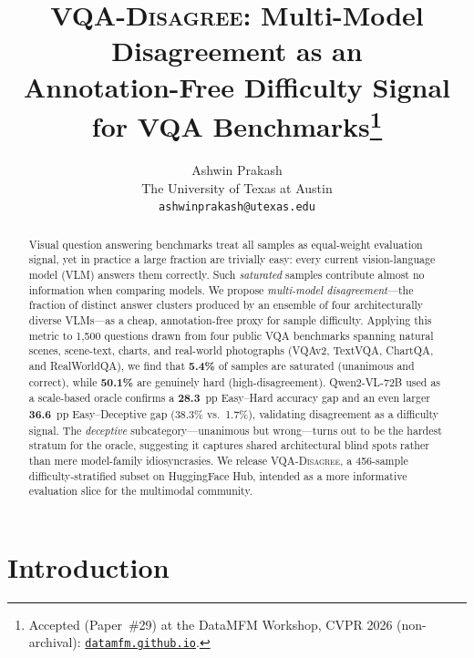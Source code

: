 \documentclass[10pt,twocolumn,letterpaper]{article}
\newcommand{\dname}{\textsc{VQA-Disagree}}
\begin{document}
\title{\dname{}: Multi-Model Disagreement as an\\Annotation-Free Difficulty Signal for VQA Benchmarks\thanks{Accepted (Paper~\#29) at the DataMFM Workshop, CVPR 2026 (non-archival): \href{https://datamfm.github.io/}{\nolinkurl{datamfm.github.io}}.}}

\author{Ashwin Prakash\\
The University of Texas at Austin\\
{\tt\small ashwinprakash@utexas.edu}
}

\maketitle

\begin{abstract}
Visual question answering benchmarks treat all samples as equal-weight evaluation
signal, yet in practice a large fraction are trivially easy: every
current vision-language model (VLM) answers them correctly.  Such
\emph{saturated} samples contribute almost no information when comparing models.
We propose \emph{multi-model disagreement}---the fraction of distinct answer
clusters produced by an ensemble of four architecturally diverse
VLMs---as a cheap, annotation-free proxy for sample difficulty.  Applying
this metric to 1,500 questions drawn from four public VQA benchmarks spanning
natural scenes, scene-text, charts, and real-world photographs (VQAv2,
TextVQA, ChartQA, and RealWorldQA), we find that
\textbf{5.4\%} of samples are saturated (unanimous and correct),
while \textbf{50.1\%} are genuinely hard (high-disagreement).  Qwen2-VL-72B
used as a scale-based oracle confirms a \textbf{28.3}~pp Easy--Hard
accuracy gap and an even larger \textbf{36.6}~pp Easy--Deceptive gap
(38.3\% vs.\ 1.7\%), validating disagreement as a difficulty signal.
The \emph{deceptive} subcategory---unanimous but wrong---turns out to be
the hardest stratum for the oracle, suggesting it captures shared
architectural blind spots rather than mere model-family idiosyncrasies.
We release \dname{}, a 456-sample difficulty-stratified subset on
HuggingFace Hub, intended as a more informative evaluation slice for the
multimodal community.
\end{abstract}

\section{Introduction}
\label{sec:intro}
\end{document}
